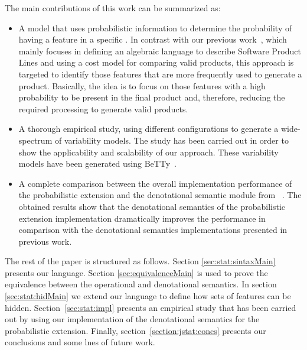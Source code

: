 The main contributions of this work can be summarized as:

\begin{itemize}

	\item 
	
	A model that uses probabilistic information to determine the probability of having a feature in a specific \SPL. In contrast with our previous work~\cite{acl13,clc16}, which mainly focuses in defining an algebraic language to describe Software Product Lines and using a cost model for comparing valid products, this approach is targeted to identify those features that are more frequently used to generate a product. Basically, the idea is to focus on those features with a high probability to be present in the final product and, therefore, reducing the required processing to generate valid products. 
		
	\item  A thorough empirical study, using different configurations to generate a wide-spectrum of variability models. The  study has been carried out in order to show the applicability and scalability of our approach. These variability models have been generated using BeTTy~\cite{SeguraHBC11}.
	
	\item A complete comparison between the overall implementation performance of the probabilistic extension and the denotational semantic module from \fodaPA~\cite{acl13}. The obtained results show that the denotational semantics of the probabilistic extension implementation dramatically improves the performance
in comparison with the denotational semantics implementations presented in previous work.

\end{itemize}


The rest of the paper is structured as follows. Section \ref{sec:stat:sintaxMain} presents our language. Section \ref{sec:equivalenceMain} is used to prove the equivalence between the operational and denotational semantics. In section \ref{sec:stat:hidMain} we extend our language to define how sets of features can be hidden. Section~\ref{sec:stat:impl} presents an empirical study that has been carried out by using our implementation of the denotational semantics for the probabilistic extension. Finally, section~\ref{section:jstat:concs} presents our conclusions and some lnes of future work.





